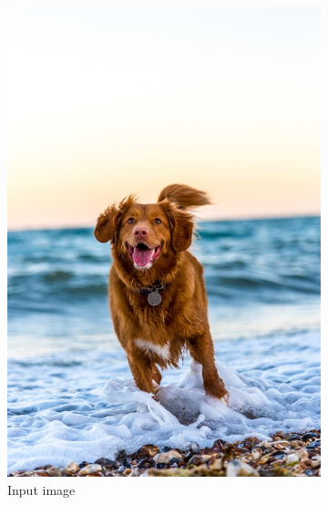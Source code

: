 \documentclass[11pt]{article}
\begin{document}
\begin{figure}[h]
     \centering
     \begin{subfigure}[b]{0.25\textwidth}
         \centering
         \includegraphics[width=\textwidth]{animal-centre2.jpg}
         \caption{Input image}
         \label{fig:input}
     \end{subfigure}
     \begin{subfigure}[b]{0.25\textwidth}
         \centering

\end{subfigure}
\end{figure}
\end{document}
